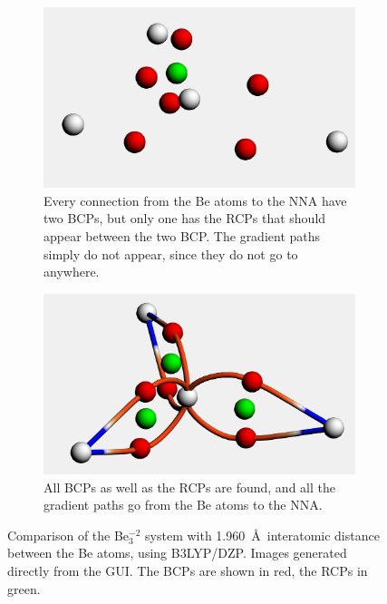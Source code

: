 \begin{figure}[hb!]
  \begin{subfigure}[t]{0.45\textwidth}
    \centering
    \includegraphics[width=\textwidth]{img/nna_no.png}
    \caption{Every connection from the Be atoms to the NNA have two \glspl{BCP}, but
      only one has the \glspl{RCP} that should appear between the two \gls{BCP}. The gradient
      paths simply do not appear, since they do not go to anywhere.}
    \label{OldVersion}
  \end{subfigure}
  \hfill%
  \begin{subfigure}[t]{0.45\textwidth}
    \centering
    \includegraphics[width=\textwidth]{img/nna_yes_cropped.png}
    \caption{All \glspl{BCP} as well as the \glspl{RCP} are found, and all the gradient
      paths go from the Be atoms to the NNA.}
    \label{NewVersion}
  \end{subfigure}
  \caption{Comparison of the Be$_3^{-2}$ system with 1.960~\AA\ interatomic distance
    between the Be atoms, using B3LYP/DZP. Images generated directly from the \ams \gls{GUI}.
    The \glspl{BCP} are shown in red, the \glspl{RCP} in green.}
  \label{beTriang}
\end{figure}

